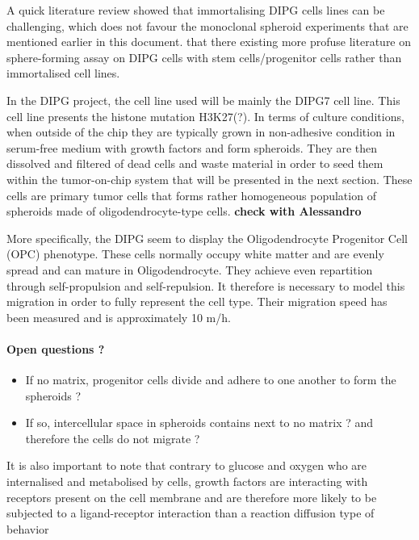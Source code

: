 \documentclass[11pt,a4paper]{article}
\begin{document}
A quick literature review showed that immortalising DIPG cells lines can be challenging, which does not favour the monoclonal spheroid experiments that are mentioned earlier in this document.\cite{Sun2019}\cite{Meel2018} that there existing more profuse literature on sphere-forming assay on DIPG cells with stem cells/progenitor cells rather than immortalised cell lines.

In the DIPG project, the cell line used will be mainly the DIPG7 cell line. This cell line presents the histone mutation H3K27(?). In terms of culture conditions, when outside of the chip they are typically grown in non-adhesive condition in serum-free medium with growth factors and form spheroids. They are then dissolved and filtered of dead cells and waste material in order to seed them within the tumor-on-chip system that will be presented in the next section. These cells are primary tumor cells that forms rather homogeneous population of spheroids made of oligodendrocyte-type cells. \textbf{check with Alessandro} 

More specifically, the DIPG seem to display the Oligodendrocyte Progenitor Cell (OPC) phenotype. These cells normally occupy white matter and are evenly spread and can mature in Oligodendrocyte. They achieve even repartition through self-propulsion and self-repulsion.\cite{Hughes2013} It therefore is necessary to model this migration in order to fully represent the cell type. Their migration speed has been measured and is approximately 10 \textmu m/h.\cite{Happel2013} 

\paragraph{Open questions ?}
\begin{itemize}
\item If no matrix, progenitor cells divide and adhere to one another to form the spheroids ?
\item If so, intercellular space in spheroids contains next to no matrix ? and therefore the cells do not migrate ? 
\end{itemize}

It is also important to note that contrary to glucose and oxygen who are internalised and metabolised by cells, growth factors are interacting with receptors present on the cell membrane and are therefore more likely to be subjected to  a ligand-receptor interaction than a reaction diffusion type of behavior
\end{document}
